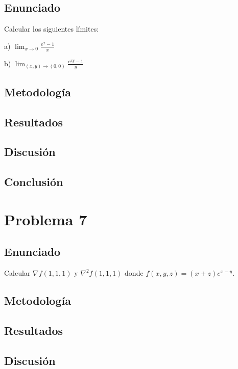 \documentclass{article}
\begin{document}
\subsection{Enunciado}
Calcular los siguientes límites:

a) $\lim_{x \to 0} \frac{e^x - 1}{x}$

b) $\lim_{(x,y) \to (0,0)} \frac{e^{xy} - 1}{y}$

\subsection{Metodología}

\subsection{Resultados}
\setcounter{equation}{0}

\subsection{Discusión}

\subsection{Conclusión}

\section{Problema 7}

\subsection{Enunciado}
Calcular $\nabla f(1, 1, 1)$ y $\nabla^2 f(1, 1, 1)$ donde $f(x, y, z) = (x + z)e^{x-y}$.

\subsection{Metodología}

\subsection{Resultados}
\setcounter{equation}{0}

\subsection{Discusión}
\end{document}

